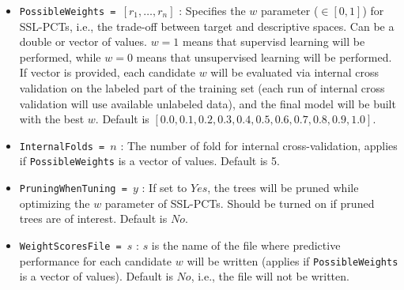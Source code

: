 \begin{itemize}
	\item {\tt PossibleWeights = $\left[ r_1, \ldots, r_n\right]$} : Specifies the $w$ parameter ($\in [0,1]$) for SSL-PCTs, i.e., the trade-off between target and descriptive spaces. Can be a double or vector of values. $w=1$ means that supervisd learning will be performed, while $w=0$ means that unsupervised learning will be performed. If vector is provided, each candidate $w$ will be evaluated via internal cross validation on the labeled part of the training set (each run of internal cross validation will use available unlabeled data), and the final model will be built with the best $w$. Default is $[0.0,0.1,0.2,0.3,0.4,0.5,0.6,0.7,0.8,0.9,1.0]$.
	\item {\tt InternalFolds = $n$} : The number of fold for internal cross-validation, applies if {\tt PossibleWeights} is a vector of values. Default is 5.
	\item {\tt PruningWhenTuning = $y$} : If set to $Yes$, the trees will be pruned while optimizing the $w$ parameter of SSL-PCTs. Should be turned on if pruned trees are of interest. Default is $No$.
	\item {\tt WeightScoresFile = $s$} : $s$ is the name of the file where predictive performance for each candidate $w$ will be written (applies if {\tt PossibleWeights} is a vector of values). Default is $No$, i.e., the file will not be written.
\end{itemize}
